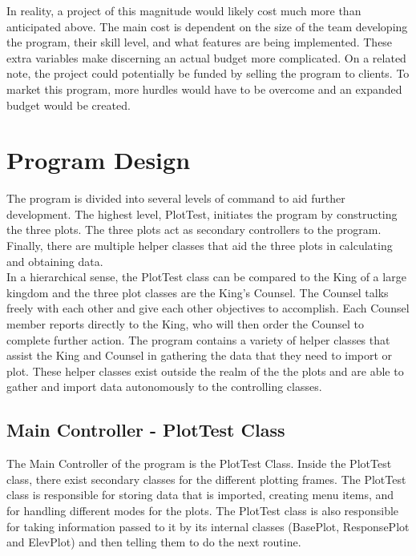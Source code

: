 \documentclass[12pt]{article}
\begin{document}
In reality, a project of this magnitude would likely cost much more than anticipated above. The main cost is dependent on the size of the team developing the program, their skill level, and what features are being implemented. These extra variables make discerning an actual budget more complicated. On a related note, the project could potentially be funded by selling the program to clients. To market this program, more hurdles would have to be overcome and an expanded budget would be created.

\section{Program Design}

The program is divided into several levels of command to aid further development. The highest level, PlotTest, initiates the program by constructing the three plots. The three plots act as secondary controllers to the program. Finally, there are multiple helper classes that aid the three plots in calculating and obtaining data. \\

In a hierarchical sense, the PlotTest class can be compared to the King of a large kingdom and the three plot classes are the King's Counsel. The Counsel talks freely with each other and give each other objectives to accomplish. Each Counsel member reports directly to the King, who will then order the Counsel to complete further action. The program contains a variety of helper classes that assist the King and Counsel in gathering the data that they need to import or plot. These helper classes exist outside the realm of the the plots and are able to gather and import data autonomously to the controlling classes.

\subsection{Main Controller - PlotTest Class}

The Main Controller of the program is the PlotTest Class. Inside the PlotTest class, there exist secondary classes for the different plotting frames. The PlotTest class is responsible for storing data that is imported, creating menu items, and for handling different modes for the plots. The PlotTest class is also responsible for taking information passed to it by its internal classes (BasePlot, ResponsePlot and ElevPlot) and then telling them to do the next routine. \\
\end{document}
